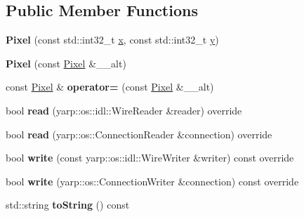 \subsection*{Public Member Functions}
\begin{DoxyCompactItemize}
\item 
\mbox{\label{classyarp_1_1sig_1_1Pixel_aa0a1a65247fae9dbe0e7589d87c111bb}} 
{\bfseries Pixel} (const std\+::int32\+\_\+t \mbox{\hyperlink{classyarp_1_1sig_1_1Pixel_ad3071410597bc7271a53b7df7bc796fc}{x}}, const std\+::int32\+\_\+t \mbox{\hyperlink{classyarp_1_1sig_1_1Pixel_a603768ad1ecf291c12d2f56e0828625c}{y}})
\item 
\mbox{\label{classyarp_1_1sig_1_1Pixel_ad41b620ffa2be8a6440bb8c287be6a21}} 
{\bfseries Pixel} (const \mbox{\hyperlink{classyarp_1_1sig_1_1Pixel}{Pixel}} \&\+\_\+\+\_\+alt)
\item 
\mbox{\label{classyarp_1_1sig_1_1Pixel_a3f766f3526afe7a8359cd8a91def844d}} 
const \mbox{\hyperlink{classyarp_1_1sig_1_1Pixel}{Pixel}} \& {\bfseries operator=} (const \mbox{\hyperlink{classyarp_1_1sig_1_1Pixel}{Pixel}} \&\+\_\+\+\_\+alt)
\item 
\mbox{\label{classyarp_1_1sig_1_1Pixel_ad8f9c81dd683b06070031fc1eb0858d2}} 
bool {\bfseries read} (yarp\+::os\+::idl\+::\+Wire\+Reader \&reader) override
\item 
\mbox{\label{classyarp_1_1sig_1_1Pixel_aa656813c4239303040dbbc6f16571a0a}} 
bool {\bfseries read} (yarp\+::os\+::\+Connection\+Reader \&connection) override
\item 
\mbox{\label{classyarp_1_1sig_1_1Pixel_aaa84a2bdc7c3bf6efbcbc0ddf44bf114}} 
bool {\bfseries write} (const yarp\+::os\+::idl\+::\+Wire\+Writer \&writer) const override
\item 
\mbox{\label{classyarp_1_1sig_1_1Pixel_afbd07d62192ed95934472c120365bd00}} 
bool {\bfseries write} (yarp\+::os\+::\+Connection\+Writer \&connection) const override
\item 
\mbox{\label{classyarp_1_1sig_1_1Pixel_a1732e1f91e28152c3b8d4935b562a4ef}} 
std\+::string {\bfseries to\+String} () const
\end{DoxyCompactItemize}
